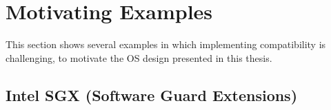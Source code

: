 \begin{comment}
\item
We identify the suboptimal lookup latency in \emph{Linux file system directory cache}
~\cite{tsai15dcache}.
This heavily engineered OS component
optimizes looking up paths in file systems,
yet the searching in the directory cache is closely interleaved
with permission checks against security models,
and file system features such as resolving symbolic links.
We optimize the lookup hit latency by decoupling cache searching
from other operations.
We cache the result of permission checks on path prefixes in a data structure
called prefix check cache,
which will be invalidated when permission changes.
The hit latency of {\tt stat} system calls on a long path
can be optimized to up to 27\%,
improving the execution time
for Dovecot IMAP server by up to 12\%
and GIT version control system by up to 25\%.


\end{compactitem}
\end{comment}


\section{Motivating Examples}

This section shows several examples in which implementing compatibility is challenging, to motivate the OS design presented in this thesis.


\subsection{Intel SGX (Software Guard Extensions)}

